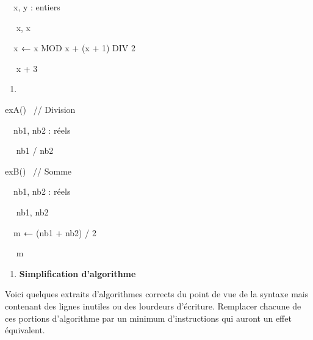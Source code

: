 {\sffamily
\ \ x, y : entiers}

{\sffamily
\ \  x, x}

{\sffamily
\texttt{\ \ }x {\textbf{←}} x MOD x + (x + 1)
DIV 2}

{\sffamily
\ \  x + 3}

{\sffamily
{} }


\bigskip

\liststyleExercice
\setcounter{saveenum}{\value{enumi}}
\begin{enumerate}
\setcounter{enumi}{\value{saveenum}}
\item {\sffamily\bfseries
{}}
\end{enumerate}
{
}

{\sffamily
{} exA() \ // Division}

{\sffamily
\ \ nb1, nb2 : réels}

{\sffamily
\ \  nb1 / nb2}

{\sffamily
{}\textstyleMotCl{\textmd{ }}}


\bigskip

{\sffamily
{} exB() \ // Somme}

{\sffamily
\ \ nb1, nb2 : réels}

{\sffamily
\ \  nb1, nb2}

{\sffamily
\ \ m {\textbf{←}} (nb1 + nb2) / 2}

{\sffamily
\ \  m}

{\sffamily
{}\textstyleMotCl{\textmd{ }}}


\bigskip

\liststyleExercice
\setcounter{saveenum}{\value{enumi}}
\begin{enumerate}
\setcounter{enumi}{\value{saveenum}}
\item {\sffamily\bfseries
Simplification d'algorithme}
\end{enumerate}
{
Voici quelques extraits d’algorithmes corrects du point de vue de la
syntaxe mais contenant des lignes inutiles ou des lourdeurs d’écriture.
Remplacer chacune de ces portions d’algorithme par un minimum
d’instructions qui auront un effet équivalent.}

